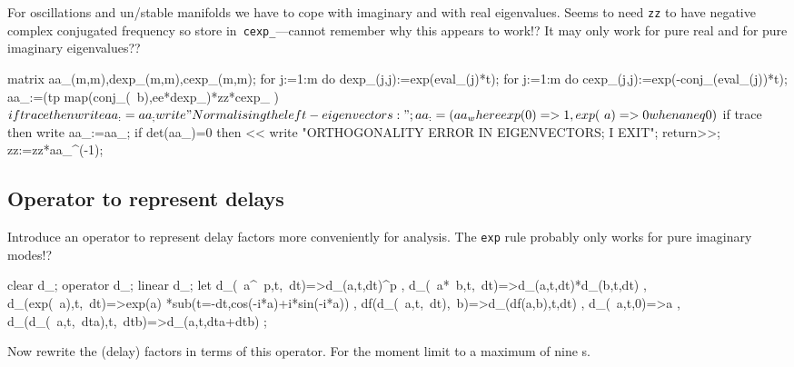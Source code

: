 \documentclass[11pt,a5paper]{article}
\begin{document}
For oscillations and un/stable manifolds we have to cope
with imaginary and with real eigenvalues. Seems to need
\verb|zz| to have negative complex conjugated frequency so
store in~\verb|cexp_|---cannot remember why this appears to
work!?  It may only work for pure real and for pure
imaginary eigenvalues??

\begin{reduce}
matrix aa_(m,m),dexp_(m,m),cexp_(m,m);
for j:=1:m do dexp_(j,j):=exp(eval_(j)*t);
for j:=1:m do cexp_(j,j):=exp(-conj_(eval_(j))*t); 
aa_:=(tp map(conj_(~b),ee*dexp_)*zz*cexp_ )$
if trace then write aa_:=aa_;
write "Normalising the left-eigenvectors:";
aa_:=(aa_ where {exp(0)=>1, exp(~a)=>0 when a neq 0})$
if trace then write aa_:=aa_;
if det(aa_)=0 then << write
    "ORTHOGONALITY ERROR IN EIGENVECTORS; I EXIT"; 
    return>>;
zz:=zz*aa_^(-1);
\end{reduce}


\subsection{Operator to represent delays}

Introduce an operator to represent delay factors more
conveniently for analysis.  The \verb|exp| rule probably
only works for pure imaginary modes!?
\begin{reduce}
clear d_; operator d_; linear d_;
let { d_(~a^~p,t,~dt)=>d_(a,t,dt)^p
    , d_(~a*~b,t,~dt)=>d_(a,t,dt)*d_(b,t,dt)
    , d_(exp(~a),t,~dt)=>exp(a)
        *sub(t=-dt,cos(-i*a)+i*sin(-i*a))
    , df(d_(~a,t,~dt),~b)=>d_(df(a,b),t,dt)
    , d_(~a,t,0)=>a
    , d_(d_(~a,t,~dta),t,~dtb)=>d_(a,t,dta+dtb)
    };
\end{reduce}

Now rewrite the (delay) factors in terms of this operator.
For the moment limit to a maximum of nine \ode{}s.
\end{document}
